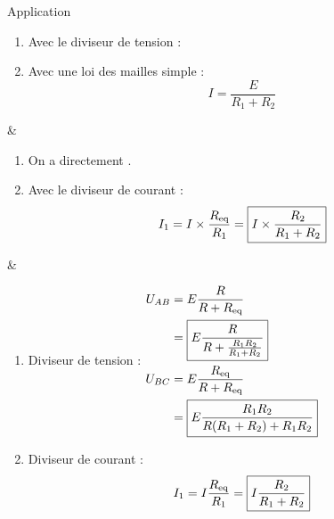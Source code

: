\documentclass[../main/main.tex]{subfiles}
\begin{document}
\begin{NCexem}[tabularx={Y|Y|Y}]{Application}
    \begin{enumerate}
        \item Avec le diviseur de tension :
        \item Avec une loi des mailles simple :
            \[\boxed{I = \frac{E}{R_1+R_2}}\]
    \end{enumerate}
    &
    \begin{enumerate}
        \item On a directement .
        \item Avec le diviseur de courant :
            \[I_1 = I\times \frac{R_{\rm eq}}{R_1} = \boxed{I\times
            \frac{R_2}{R_1+R_2}}\]
    \end{enumerate}
    &
    \begin{enumerate}
        \item Diviseur de tension :\smallbreak
            $\begin{aligned}
                U_{AB} & = E \frac{R}{R+R_{\rm eq}}\\
                       & = \boxed{E \frac{R}{R + \frac{R_1R_2}{R_1+R_2}}}\\
                U_{BC} & = E \frac{R_{\rm eq}}{R + R_{\rm eq}}\\
                       & = \boxed{E \frac{R_1R_2}{R(R_1+R_2)+R_1R_2}}
            \end{aligned}$
        \item Diviseur de courant :
            \[I_1 = I \frac{R_{\rm eq}}{R_1} = \boxed{I \frac{R_2}{R_1+R_2}}\]
    \end{enumerate}
    ~
\end{NCexem}

\setcounter{section}{7}
\end{document}
